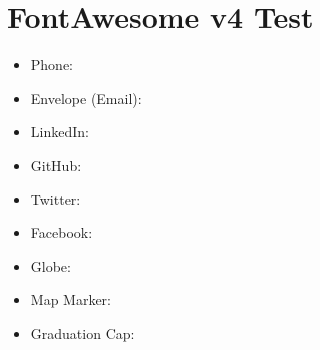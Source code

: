\documentclass{article}
\begin{document}
\section*{FontAwesome v4 Test}

\begin{itemize}
    \item Phone: \faPhone
    \item Envelope (Email): \faEnvelope
    \item LinkedIn: \faLinkedinSquare
    \item GitHub: \faGithubSquare
    \item Twitter: \faTwitter
    \item Facebook: \faFacebookSquare
    \item Globe: \faGlobe
    \item Map Marker: \faMapMarker
    \item Graduation Cap: \faGraduationCap
\end{itemize}
\end{document}
